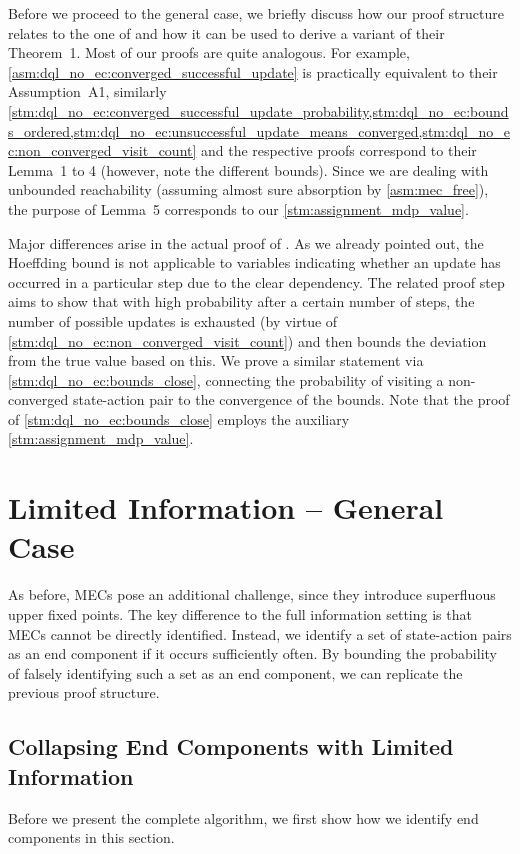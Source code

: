 \documentclass{article}
\begin{document}
\begin{remark}
	Before we proceed to the general case, we briefly discuss how our proof structure relates to the one of \cite{DBLP:conf/icml/StrehlLWLL06} and how it can be used to derive a variant of their Theorem~1.
	Most of our proofs are quite analogous.
	For example, \cref{asm:dql_no_ec:converged_successful_update} is practically equivalent to their Assumption~A1, similarly \cref{stm:dql_no_ec:converged_successful_update_probability,stm:dql_no_ec:bounds_ordered,stm:dql_no_ec:unsuccessful_update_means_converged,stm:dql_no_ec:non_converged_visit_count} and the respective proofs correspond to their Lemma~1 to 4 (however, note the different bounds).
	Since we are dealing with unbounded reachability (assuming almost sure absorption by \cref{asm:mec_free}), the purpose of Lemma~5 corresponds to our \cref{stm:assignment_mdp_value}.

	Major differences arise in the actual proof of \cite[Theorem~1]{DBLP:conf/icml/StrehlLWLL06}.
	As we already pointed out, the Hoeffding bound is not applicable to variables indicating whether an update has occurred in a particular step due to the clear dependency.
	The related proof step aims to show that with high probability after a certain number of steps, the number of possible updates is exhausted (by virtue of \cref{stm:dql_no_ec:non_converged_visit_count}) and then bounds the deviation from the true value based on this.
	We prove a similar statement via \cref{stm:dql_no_ec:bounds_close}, connecting the probability of visiting a non-converged state-action pair to the convergence of the bounds.
	Note that the proof of \cref{stm:dql_no_ec:bounds_close} employs the auxiliary \cref{stm:assignment_mdp_value}.
\end{remark}
 	\section{Limited Information -- General Case} \label{sec:dql}

As before, MECs pose an additional challenge, since they introduce superfluous upper fixed points.
The key difference to the full information setting is that MECs cannot be directly identified.
Instead, we identify a set of state-action pairs as an end component if it occurs sufficiently often.
By bounding the probability of falsely identifying such a set as an end component, we can replicate the previous proof structure.
\subsection{Collapsing End Components with Limited Information}
Before we present the complete algorithm, we first show how we identify end components in this section.
\end{document}
